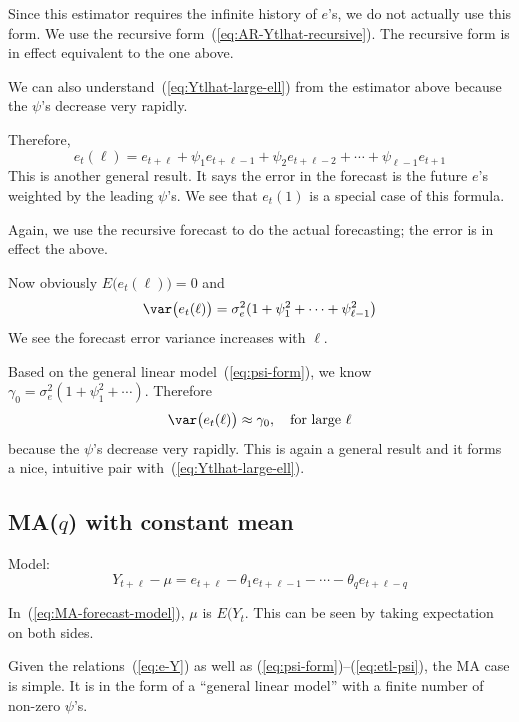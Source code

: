 \documentclass[12pt]{article}
\begin{document}
\alert
Since this estimator requires the infinite history of $e$'s,
we do not actually use this form.
We use the recursive form~(\ref{eq:AR-Ytlhat-recursive}).
The recursive form is in effect equivalent to the one above.

\alert
We can also understand~(\ref{eq:Ytlhat-large-ell})
from the estimator above because the $\psi$'s decrease very rapidly.

Therefore,
\begin{equation}\label{eq:etl-psi}
e_t(\ell)
= e_{t+\ell} + \psi_1 e_{t+\ell-1} + \psi_2 e_{t+\ell-2}
    + \dotsb + \psi_{\ell-1} e_{t+1}
\end{equation}
This is another general result.
It says the error in the forecast
is the future $e$'s weighted by the leading $\psi$'s.
We see that $e_t(1)$ is a special case of this formula.

\alert
Again, we use the recursive forecast to do the actual forecasting;
the error is in effect the above.

Now obviously $E\bigl(e_t(\ell)\bigr) =0$ and
\begin{equation}\label{eq:var-etl-psi}
\var\bigl(e_t(\ell)\bigr)
= \sigma^2_e (1 + \psi_1^2 + \dotsb + \psi_{\ell-1}^2\bigr)
\end{equation}
We see the forecast error variance increases with $\ell$.

Based on the general linear model~(\ref{eq:psi-form}),
we know
$\gamma_0 = \sigma^2_e (1 + \psi_1^2 +\dotsb)$.
Therefore
\begin{equation}\label{eq:var-etl-large-ell}
\var\bigl(e_t(\ell)\bigr) \approx \gamma_0,\quad
\text{for large $\ell$}
\end{equation}
because the $\psi$'s decrease very rapidly.
This is again a general result and
it forms a nice, intuitive pair with~(\ref{eq:Ytlhat-large-ell}).

\subsection{MA($q$) with constant mean}

Model:
\begin{equation}\label{eq:MA-forecast-model}
Y_{t+\ell} - \mu
= e_{t+\ell} - \theta_1 e_{t+\ell-1} - \dotsb
    - \theta_q e_{t+\ell-q}
\end{equation}

\alert
In~(\ref{eq:MA-forecast-model}),
$\mu$ is $E(Y_t$.
This can be seen by taking expectation on both sides.

Given the relations~(\ref{eq:e-Y})
as well as (\ref{eq:psi-form})--(\ref{eq:etl-psi}),
the MA case is simple.
It is in the form of a ``general linear model''
with a finite number of non-zero $\psi$'s.
\end{document}
